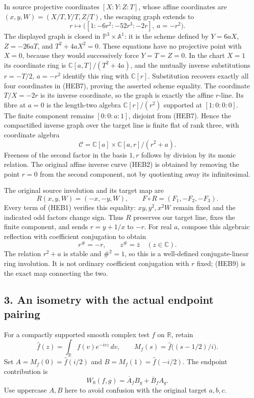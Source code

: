 \documentclass[
  10pt,
  a4paper,
]{article}
\begin{document}
In source projective coordinates \([X:Y:Z:T]\), whose affine coordinates
are \((x,y,W)=(X/T,Y/T,Z/T)\), the escaping graph extends to \[
r\longmapsto\bigl([1:-6r^2:-52r^3:-2r],\ a=-r^2\bigr).
\tag{HEB7}
\] The displayed graph is closed in \(\mathbb P^3\times\mathbb A^1\): it
is the scheme defined by \(Y=6aX\), \(Z=-26aT\), and \(T^2+4aX^2=0\).
These equations have no projective point with \(X=0\), because they
would successively force \(Y=T=Z=0\). In the chart \(X=1\) its
coordinate ring is \(\mathbb C[a,T]/(T^2+4a)\), and the mutually inverse
substitutions \(r=-T/2\), \(a=-r^2\) identify this ring with
\(\mathbb C[r]\). Substitution recovers exactly all four coordinates in
(HEB7), proving the asserted scheme equality. The coordinate \(T/X=-2r\)
is its inverse coordinate, so the graph is exactly the affine
\(r\)-line. Its fibre at \(a=0\) is the length-two algebra
\(\mathbb C[r]/(r^2)\) supported at \([1:0:0:0]\). The finite component
remains \([0:0:a:1]\), disjoint from (HEB7). Hence the compactified
inverse graph over the target line is finite flat of rank three, with
coordinate algebra \[
\mathcal C=\mathbb C[a]\times\mathbb C[a,r]/(r^2+a).
\tag{HEB8}
\] Freeness of the second factor in the basis \(1,r\) follows by
division by its monic relation. The original affine inverse curve (HEB2)
is obtained by removing the point \(r=0\) from the second component, not
by quotienting away its infinitesimal.

The original source involution and its target map are \[
R(x,y,W)=(-x,-y,W),\qquad
F\circ R=(F_1,-F_2,-F_3).
\tag{HEB9}
\] Every term of (HEB1) verifies this equality: \(xy,y^2,x^2W\) remain
fixed and the indicated odd factors change sign. Thus \(R\) preserves
our target line, fixes the finite component, and sends \(r=y+1/x\) to
\(-r\). For real \(a\), compose this algebraic reflection with
coefficient conjugation to obtain \[
r^\#=-r,\qquad z^\#=\bar z\quad(z\in\mathbb C).
\tag{HEB10}
\] The relation \(r^2+a\) is stable and \(\#^2=1\), so this is a
well-defined conjugate-linear ring involution. It is not ordinary
coefficient conjugation with \(r\) fixed; (HEB9) is the exact map
connecting the two.

\subsection{3. An isometry with the actual endpoint
pairing}\label{an-isometry-with-the-actual-endpoint-pairing}

For a compactly supported smooth complex test \(f\) on \(\mathbb R\),
retain \[
\widehat f(z)=\int_{\mathbb R}f(v)e^{-ivz}\,dv,
\qquad M_f(s)=\widehat f\bigl((s-1/2)/i\bigr).
\tag{HEB11}
\] Set \(A=M_f(0)=\widehat f(i/2)\) and \(B=M_f(1)=\widehat f(-i/2)\).
The endpoint contribution is \[
W_0(f,g)=\overline A_f B_g+\overline B_f A_g.
\tag{HEB12}
\] Use uppercase \(A,B\) here to avoid confusion with the original
target \(a,b,c\).
\end{document}

